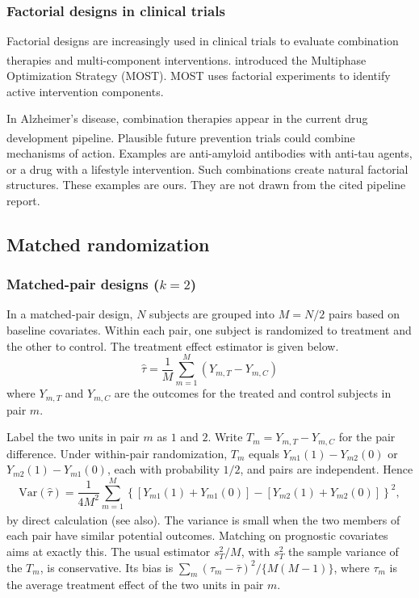 \documentclass[
  11pt,
]{article}
\begin{document}
\subsubsection{Factorial designs in clinical trials}\label{factorial-designs-in-clinical-trials}

Factorial designs are increasingly used in clinical trials
to evaluate combination therapies and multi-component
interventions.\textsuperscript{} introduced
the Multiphase Optimization Strategy (MOST). MOST uses
factorial experiments to identify active intervention
components.

In Alzheimer's disease, combination therapies appear in the
current drug development pipeline\textsuperscript{}. Plausible future prevention
trials could combine mechanisms of action. Examples are
anti-amyloid antibodies with anti-tau agents, or a drug with
a lifestyle intervention. Such combinations create natural
factorial structures. These examples are ours. They are not
drawn from the cited pipeline report.

\subsection{Matched randomization}\label{matched-randomization}

\subsubsection{\texorpdfstring{Matched-pair designs (\(k = 2\))}{Matched-pair designs (k = 2)}}\label{matched-pair-designs-k-2}

In a matched-pair design, \(N\) subjects are grouped into \(M =
N/2\) pairs based on baseline covariates. Within each pair, one
subject is randomized to treatment and the other to control.
The treatment effect estimator is given below.
\begin{equation}
  \hat{\tau} = \frac{1}{M} \sum_{m=1}^{M}
    (Y_{m,T} - Y_{m,C})
\end{equation}
where \(Y_{m,T}\) and \(Y_{m,C}\) are the outcomes for the treated
and control subjects in pair \(m\).

Label the two units in pair \(m\) as \(1\) and \(2\). Write
\(T_m = Y_{m,T} - Y_{m,C}\) for the pair difference. Under
within-pair randomization, \(T_m\) equals \(Y_{m1}(1) -
Y_{m2}(0)\) or \(Y_{m2}(1) - Y_{m1}(0)\), each with probability
\(1/2\), and pairs are independent. Hence
\begin{equation}
  \text{Var}(\hat{\tau}) = \frac{1}{4M^2} \sum_{m=1}^{M}
    \left\{ [Y_{m1}(1) + Y_{m1}(0)] -
            [Y_{m2}(1) + Y_{m2}(0)] \right\}^2 ,
\end{equation}
by direct calculation (see also\textsuperscript{}). The variance is small when
the two members of each pair have similar potential
outcomes. Matching on prognostic covariates aims at exactly
this. The usual estimator \(s_T^2/M\), with \(s_T^2\) the sample
variance of the \(T_m\), is conservative. Its bias is
\(\sum_m (\tau_m - \bar\tau)^2 / \{M(M-1)\}\), where \(\tau_m\)
is the average treatment effect of the two units in pair
\(m\).
\end{document}
